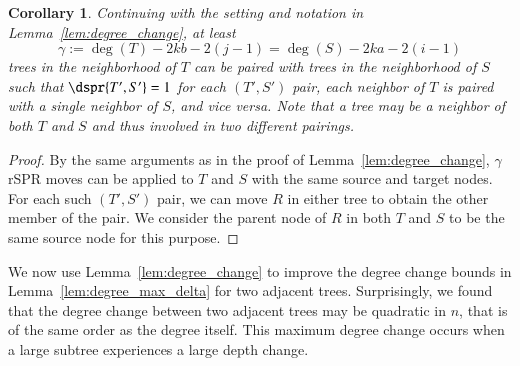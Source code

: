 \documentclass[]{elsarticle}
\newtheorem{cor}[thm]{Corollary}
\newcommand{\overlap}{%
	\gamma
}
\begin{document}
\begin{cor}
\label{cor:paired_neighbors}
Continuing with the setting and notation in Lemma~\ref{lem:degree_change}, at least
$$\overlap := \deg(T) - 2kb - 2(j-1) = \deg(S) - 2ka - 2(i-1)$$
trees in the neighborhood of $T$ can be paired with trees in the neighborhood of $S$ such that $\dspr{T',S'} = 1$ for each $(T',S')$ pair, each neighbor of $T$ is paired with a single neighbor of $S$, and vice versa.
Note that a tree may be a neighbor of both $T$ and $S$ and thus involved in two different pairings.
\end{cor}
\begin{proof}
By the same arguments as in the proof of Lemma~\ref{lem:degree_change}, $\overlap$ rSPR moves can be applied to $T$ and $S$ with the same source and target nodes.
For each such $(T',S')$ pair, we can move $R$ in either tree to obtain the other member of the pair.
We consider the parent node of $R$ in both $T$ and $S$ to be the same source node for this purpose.
\end{proof}

We now use Lemma~\ref{lem:degree_change} to improve the degree change bounds in Lemma~\ref{lem:degree_max_delta} for two adjacent trees.
Surprisingly, we found that the degree change between two adjacent trees may be quadratic in $n$, that is of the same order as the degree itself.
This maximum degree change occurs when a large subtree experiences a large depth change.
\end{document}
